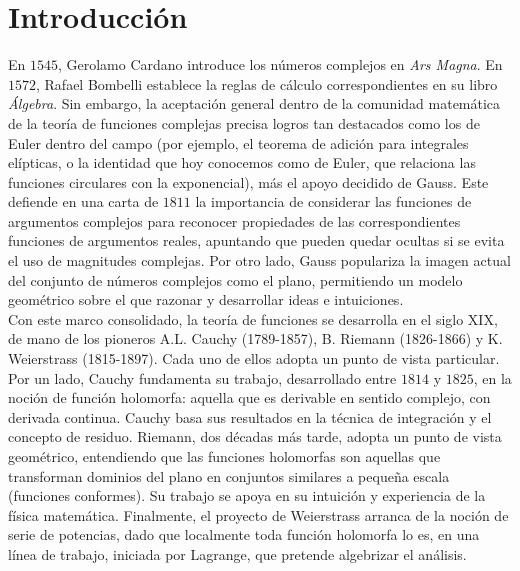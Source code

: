 %
%

\chapter{Introducción}
\label{cap:introduccion}

En $1545$, Gerolamo Cardano introduce los números complejos en \textit{Ars Magna}. En $1572$, Rafael Bombelli establece la reglas de cálculo correspondientes en su libro \textit{Álgebra}. Sin embargo, la aceptación general dentro de la comunidad matemática de la teoría de funciones complejas precisa logros tan destacados como los de Euler dentro del campo (por ejemplo, el teorema de adición para integrales elípticas, o la identidad que hoy conocemos como de Euler, que relaciona las funciones circulares con la exponencial), más el apoyo decidido de Gauss. Este defiende en una carta de $1811$ la importancia de considerar las funciones de argumentos complejos para reconocer propiedades de las correspondientes funciones de argumentos reales, apuntando que pueden quedar ocultas si se evita el uso de magnitudes complejas. Por otro lado, Gauss populariza la imagen actual del conjunto de números complejos como el plano, permitiendo un modelo geométrico sobre el que razonar y desarrollar ideas e intuiciones. \\

Con este marco consolidado, la teoría de funciones se desarrolla en el siglo XIX, de mano de los pioneros A.L. Cauchy (1789-1857), B. Riemann (1826-1866) y K. Weierstrass (1815-1897). Cada uno de ellos adopta un punto de vista particular. Por un lado, Cauchy fundamenta su trabajo, desarrollado entre $1814$ y $1825$, en la noción de función holomorfa: aquella que es derivable en sentido complejo, con derivada continua. Cauchy basa sus resultados en la técnica de integración y el concepto de residuo. Riemann, dos décadas más tarde, adopta un punto de vista geométrico, entendiendo que las funciones holomorfas son aquellas que transforman dominios del plano en conjuntos similares a pequeña escala (funciones conformes). Su trabajo se apoya en su intuición y experiencia de la física matemática. Finalmente, el proyecto de Weierstrass arranca de la noción de serie de potencias, dado que localmente toda función holomorfa lo es, en una línea de trabajo, iniciada por Lagrange, que pretende algebrizar el análisis. \\

